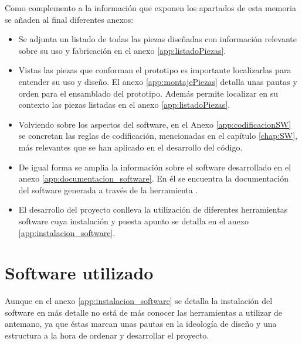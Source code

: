 Como complemento a la información que exponen los apartados de esta memoria se añaden al final diferentes anexos:

\begin{itemize}
    \item Se adjunta un listado de todas las piezas diseñadas con información relevante sobre su uso y fabricación en el anexo \ref{app:listadoPiezas}.
    \item Vistas las piezas que conforman el prototipo es importante localizarlas para entender su uso y diseño. El anexo \ref{app:montajePiezas} detalla unas pautas y orden para el ensamblado del prototipo. Además permite localizar en su contexto las piezas listadas en el anexo \ref{app:listadoPiezas}.
    \item Volviendo sobre los aspectos del software, en el Anexo \ref{app:codificacionSW} se concretan las reglas de codificación, mencionadas en el capítulo \ref{chap:SW}, más relevantes que se han aplicado en el desarrollo del código.
    \item De igual forma se amplia la información sobre el software desarrollado en el anexo \ref{app:documentacion_software}. En él se encuentra la documentación del software generada a través de la herramienta .
    \item El desarrollo del proyecto conlleva la utilización de diferentes herramientas software cuya instalación y puesta apunto se detalla en el anexo \ref{app:instalacion_software}.
\end{itemize}

\section{Software utilizado}

Aunque en el anexo \ref{app:instalacion_software} se detalla la instalación del software en más detalle no está de más conocer las herramientas a utilizar de antemano, ya que éstas marcan unas pautas en la ideología de diseño y una estructura a la hora de ordenar y desarrollar el proyecto.

